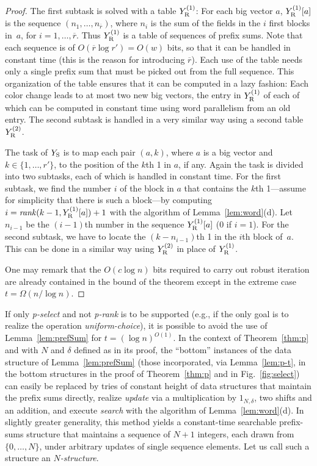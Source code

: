 \documentclass[envcountsame,envcountsect,undated,nolinenumbers]{lnthi}
\def\Tvn#1{\hbox{\textit{#1\/}}}
\def\rbar{\overline{r}}
\begin{document}
\begin{proof}
The first subtask is solved with a table $Y^{(1)}_{\mbox{\scriptsize R}}$:
For each big vector $a$, $Y^{(1)}_{\mbox{\scriptsize R}}[a]$ is the
sequence $(n_1,\ldots,n_{\rbar})$, where $n_i$ is the
sum of the fields in the $i$ first blocks in~$a$,
for $i=1,\ldots,\rbar$.
Thus $Y^{(1)}_{\mbox{\scriptsize R}}$ is a table of sequences of prefix sums.
Note that each sequence is of
$O(\rbar\log r')=O(w)$ bits, so that it can be handled
in constant time
(this is the reason for introducing $\rbar$).
Each use of the table needs only a single prefix sum that
must be picked out from the full sequence.
This organization of the table ensures that it can be
computed in a lazy fashion:
Each color change leads to at most two new big vectors,
the entry in $Y^{(1)}_{\mbox{\scriptsize R}}$ of each of which can be
computed in constant time using word parallelism
from an old entry.
The second subtask is handled in a very similar way
using a second table $Y^{(2)}_{\mbox{\scriptsize R}}$.

The task of $Y_{\mbox{\scriptsize S}}$ is to map each pair $(a,k)$,
where $a$ is a big vector and
$k\in\{1,\ldots,r'\}$, to the position of
the $k$th 1 in $a$, if any.
Again the task is divided into two subtasks,
each of which is handled in constant time. 
For the first subtask, we find the number $i$
of the block in $a$ that contains the $k$th 1---assume
for simplicity that there is such a block---by
computing
$i=\Tvn{rank}(k-1,Y^{(1)}\Tsub R[a])+1$ with the algorithm of
Lemma~\ref{lem:word}(d).
Let $n_{i-1}$ be the $(i-1)$th number in the
sequence $Y^{(1)}_{\mbox{\scriptsize R}}[a]$ (0 if $i=1$).
For the second subtask, we have to
locate the $(k-n_{i-1})$th 1 in the $i$th
block of~$a$.
This can be done in a similar way
using $Y^{(2)}_{\mbox{\scriptsize R}}$ in place of $Y^{(1)}_{\mbox{\scriptsize R}}$.

One may remark that the $O(c\log n)$ bits required to
carry out robust iteration are already contained in
the bound of the theorem except in the extreme case
$t=\Omega({n/{\log n}})$.
\end{proof}

If only \Tvn{p-select} and not \Tvn{p-rank} is
to be supported (e.g., if the only goal is to
realize the operation \Tvn{uniform-choice}),
it is possible to avoid the use of Lemma~\ref{lem:prefSum}
for $t=(\log n)^{O(1)}$.
In the context of Theorem~\ref{thm:p} and
with $N$ and $\delta$ defined as in its proof,
the ``bottom'' instances of the data structure of
Lemma~\ref{lem:prefSum}
(those incorporated, via Lemma~\ref{lem:p-t}, in
the bottom structures in the proof of
Theorem~\ref{thm:p} and in Fig.~\ref{fig:select})
can easily be replaced
by tries of constant height
of data structures that maintain the prefix sums
directly, realize \Tvn{update}
via a multiplication by
$1_{N,\delta}$, two shifts and an addition,
and execute \Tvn{search} with the algorithm
of Lemma~\ref{lem:word}(d).
In slightly greater generality, this method
yields a constant-time searchable prefix-sums structure
that maintains a sequence of $N+1$ integers,
each drawn from $\{0,\ldots,N\}$, under
arbitrary updates of single sequence elements.
Let us call such a structure an
\emph{$N$-structure}.
\end{document}
